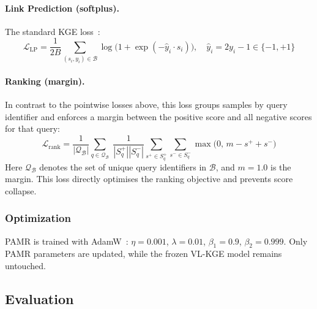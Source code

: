 \vspace{-1em}
\paragraph{Link Prediction (softplus).}  The standard KGE loss~\cite{trouillon2016complex}:
\begin{equation}
\mathcal{L}_{\text{LP}} = \frac{1}{2B} \sum_{(s_i, y_i) \in \mathcal{B}}
    \log\bigl(1 + \exp(-\hat{y}_i \cdot s_i)\bigr),\quad
    \hat{y}_i = 2y_i - 1 \in \{-1, +1\}
\label{eq:loss-lp}
\end{equation}

\vspace{-1em}
\paragraph{Ranking (margin).}  In contrast to the pointwise losses above, this loss
groups samples by query identifier and enforces a margin
between the positive score and all negative scores for that query:
\begin{equation}
\mathcal{L}_{\text{rank}} = \frac{1}{|\mathcal{Q}_{\mathcal{B}}|} \sum_{q \in \mathcal{Q}_{\mathcal{B}}}\;
    \frac{1}{|S_q^+||S_q^-|} \sum_{s^+ \in S_q^+} \sum_{s^- \in S_q^-}
    \max\bigl(0,\, m - s^+ + s^-\bigr)
\label{eq:loss-rank}
\end{equation}
Here $\mathcal{Q}_{\mathcal{B}}$ denotes the set of unique query identifiers in $\mathcal{B}$, and
$m = 1.0$ is the margin.  This loss directly optimises the ranking objective and prevents
score collapse.

\vspace{-1em}
\subsubsection{Optimization}
\vspace{-1em}
\label{sec:optimization}

PAMR is trained with AdamW~\cite{loshchilov2019decoupled}:
$\eta = 0.001$, $\lambda = 0.01$, $\beta_1 = 0.9$, $\beta_2 = 0.999$.
Only PAMR parameters are updated, while the frozen VL-KGE model remains untouched.

\vspace{-1em}
\subsection{Evaluation}
\vspace{-1em}

